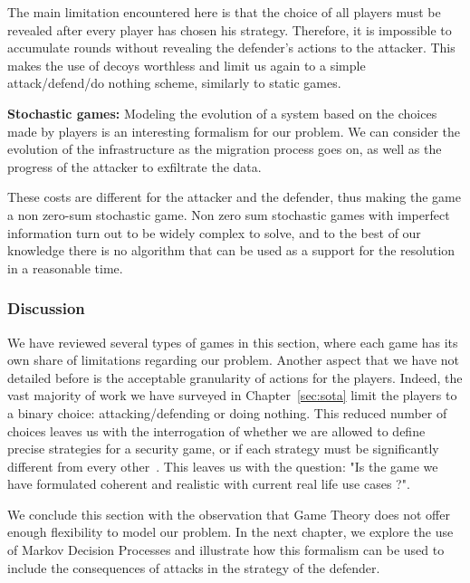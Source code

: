 The main limitation encountered here is that the choice of all players must be revealed after every player has chosen his strategy. Therefore, it is impossible to accumulate rounds without revealing the defender's actions to the attacker. This makes the use of decoys worthless and limit us again to a simple attack/defend/do nothing scheme, similarly to static games.

\textbf{Stochastic games:} Modeling the evolution of a system based on the choices made by players is an interesting formalism for our problem. We can consider the evolution of the infrastructure as the migration process goes on, as well as the progress of the attacker to exfiltrate the data. 

These costs are different for the attacker and the defender, thus making the game a non zero-sum stochastic game. Non zero sum stochastic games with imperfect information turn out to be widely complex to solve, and to the best of our knowledge there is no algorithm that can be used as a support for the resolution in a reasonable time. 


\subsubsection{Discussion}
We have reviewed several types of games in this section, where each game has its own share of limitations regarding our problem. Another aspect that we have not detailed before is the acceptable granularity of actions for the players. Indeed, the vast majority of work we have surveyed in Chapter~\ref{sec:sota} limit the players to a binary choice: attacking/defending or doing nothing. This reduced number of choices leaves us with the interrogation of whether we are allowed to define precise strategies for a security game, or if each strategy must be significantly different from every other~\cite{Kiennert2018}.%
This leaves us with the question: "Is the game we have formulated coherent and realistic with current real life use cases ?". 

We conclude this section with the observation that Game Theory does not offer enough flexibility to model our problem. In the next chapter, we explore the use of Markov Decision Processes and illustrate how this formalism can be used to include the consequences of attacks in the strategy of the defender.



